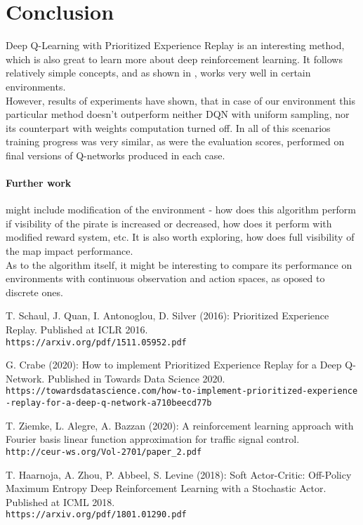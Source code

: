 \documentclass[a4paper,11pt]{article}
\theoremstyle{definition}
\begin{document}
\section{Conclusion}
Deep Q-Learning with Prioritized Experience Replay is an interesting method, which is also great to learn more about deep reinforcement learning. It follows relatively simple concepts, and as shown in \cite{schaul_2016}, works very well in certain environments. \\
However, results of experiments have shown, that in case of our environment this particular method doesn't outperform neither DQN with uniform sampling, nor its counterpart with weights computation turned off. In all of this scenarios training progress was very similar, as were the evaluation scores, performed on final versions of Q-networks produced in each case.

\paragraph{Further work} might include modification of the environment - how does this algorithm perform if visibility of the pirate is increased or decreased, how does it perform with modified reward system, etc. It is also worth exploring, how does full visibility of the map impact performance.\\
As to the algorithm itself, it might be interesting to compare its performance on environments with continuous observation and action spaces, as oposed to discrete ones.

\newpage

\begin{thebibliography}{4}

T. Schaul, J. Quan, I. Antonoglou, D. Silver (2016): Prioritized Experience Replay. Published at ICLR 2016.\\
\texttt{https://arxiv.org/pdf/1511.05952.pdf}

G. Crabe (2020): 
How to implement Prioritized Experience Replay for a Deep Q-Network. Published in Towards Data Science 2020.\\
\texttt{https://towardsdatascience.com/how-to-implement-prioritized-experience\\-replay-for-a-deep-q-network-a710beecd77b}

T. Ziemke, L. Alegre, A. Bazzan (2020): A reinforcement learning approach with Fourier basis linear function approximation for traffic signal control. \\
\texttt{http://ceur-ws.org/Vol-2701/paper\_2.pdf}

T. Haarnoja, A. Zhou, P. Abbeel, S. Levine (2018): Soft Actor-Critic: Off-Policy Maximum Entropy Deep Reinforcement Learning with a Stochastic Actor. Published at ICML 2018.\\
\texttt{https://arxiv.org/pdf/1801.01290.pdf}


\end{thebibliography}
\end{document}
